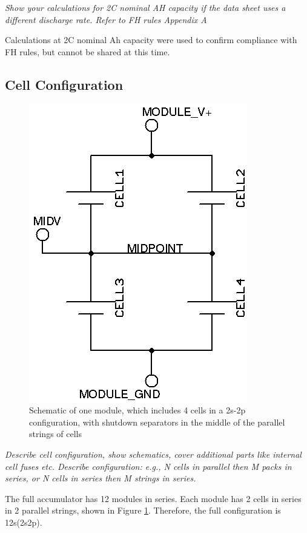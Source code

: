 \documentclass{article}
\begin{document}
        \textit{Show your calculations for 2C nominal AH capacity if the data sheet uses a different discharge rate. Refer to FH rules Appendix A}

        Calculations at 2C nominal Ah capacity were used to confirm compliance with FH rules, but cannot be shared at this time.

    \subsection{Cell Configuration}

            \begin{figure}[H]
                \centering
                \includegraphics{moduleschem}
                \caption{Schematic of one module, which includes 4 cells in a 2s-2p configuration, with shutdown separators in the middle of the parallel strings of cells}
                \label{moduleschem}
            \end{figure}

        \textit{Describe cell configuration, show schematics, cover additional parts like internal cell fuses etc. Describe configuration: e.g., N cells in parallel then M packs in series, or N cells in series then M strings in series.}

        The full accumulator has 12 modules in series. Each module has 2 cells in series in 2 parallel strings, shown in Figure \ref{moduleschem}. Therefore, the full configuration is 12s(2s2p).
\end{document}

